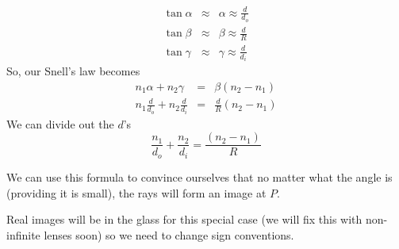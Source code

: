 \documentclass{article}
\begin{document}
\begin{eqnarray*}
\tan \alpha &\approx &\alpha \approx \frac{d}{d_{o}} \\
\tan \beta &\approx &\beta \approx \frac{d}{R} \\
\tan \gamma &\approx &\gamma \approx \frac{d}{d_{i}}
\end{eqnarray*}%
So, our Snell's law becomes%
\begin{eqnarray*}
n_{1}\alpha +n_{2}\gamma &=&\beta \left( n_{2}-n_{1}\right) \\
n_{1}\frac{d}{d_{o}}+n_{2}\frac{d}{d_{i}} &=&\frac{d}{R}\left(
n_{2}-n_{1}\right)
\end{eqnarray*}%
We can divide out the $d$'s%
\begin{equation}
\frac{n_{1}}{d_{o}}+\frac{n_{2}}{d_{i}}=\frac{\left( n_{2}-n_{1}\right) }{R}
\label{Bump_Equation}
\end{equation}

We can use this formula to convince ourselves that no matter what the angle
is (providing it is small), the rays will form an image at $P.$

Real images will be in the glass for this special case (we will fix this
with non-infinite lenses soon) so we need to change sign conventions.
\end{document}
